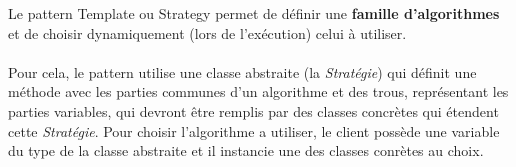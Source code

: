 \item{}
{\vrai}
{Le pattern Template ou Strategy permet de définir une \textbf{famille d'algorithmes} et de choisir dynamiquement (lors de l'exécution) celui à utiliser.
\paragraph{}
Pour cela, le pattern utilise une classe abstraite (la \textit{Stratégie}) qui définit une méthode avec les parties communes d'un algorithme et des trous, représentant les parties variables, qui devront être remplis par des classes concrètes qui étendent cette \textit{Stratégie}. Pour choisir l'algorithme a utiliser, le client possède une variable du type de la classe abstraite et il instancie une des classes conrètes au choix.
}
\item{}
{}
{}

\item{}
{}
{}

\item{}
{}
{}

\item{}
{}
{}